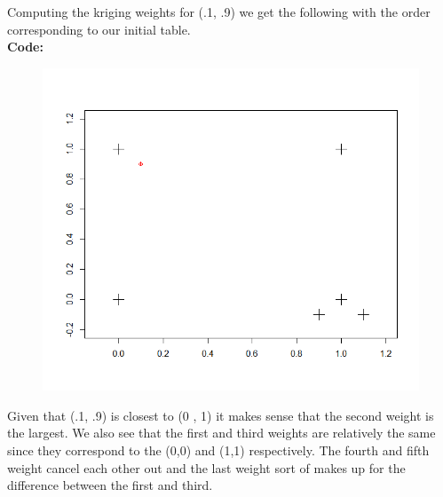 \documentclass[12pt]{article}
\makeatletter
\theoremstyle{homework}
\newenvironment{exercise}[1]
{\def\@currentlabel{#1}\exercisecore}
{\endexercisecore}
\makeatother
\begin{document}
\begin{exercise}{3}
  Computing the kriging weights for (.1, .9) we get the following with the order corresponding to our initial table. 
  \begin{equation*}
    [0.0793 ,  0.8280,  0.0811, 0.0420, -0.0440, 0.0140]
  \end{equation*}
  \textbf{Code:}
  \begin{center}
  
  \end{center}
  \begin{figure}[H]
    \begin{center}
    \includegraphics[width = \textwidth]{Rplot06.png}
    \end{center}
  \end{figure}

  Given that  (.1, .9) is closest to (0 , 1) it makes sense that the second weight is the largest. We also see that the first and third weights 
  are relatively the same since they correspond to the (0,0) and (1,1) respectively. The fourth and fifth weight cancel each other out and the last weight 
  sort of makes up for the difference between the first and third.   \\



\end{exercise}
\end{document}
